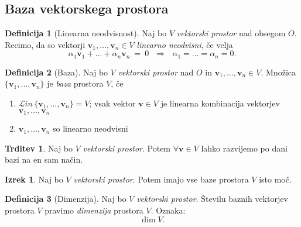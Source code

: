\documentclass[11pt]{article}
\newcommand{\vv}{\mathbf{v}}
\newcommand{\0}{\mathbf{0}}
\newcommand{\Lin}{\mathcal{L}\textit{in}\,}
\theoremstyle{definition}
\newtheorem{definicija}{Definicija}[section]
\theoremstyle{definition}
\newtheorem{trditev}{Trditev}[section]
\theoremstyle{definition}
\newtheorem{izrek}{Izrek}[section]
\theoremstyle{definition}
\begin{document}

\subsection{Baza vektorskega prostora}
\vspace{0.5cm}

\begin{definicija}[Linearna neodvisnost]

Naj bo $V$ \textit{vektorski prostor} nad obsegom $O$. Recimo, da so vektorji $\vv_1,\ldots,\vv_n \in V$ \textit{linearno neodvisni}, če velja
$$\alpha_1\vv_1 + \ldots + \alpha_n\vv_n ~=~ 0 ~~~\Longrightarrow~~~ \alpha_1 = \ldots = \alpha_n = 0.$$

\end{definicija}
\vspace{0.5cm}

\begin{definicija}[Baza]

Naj bo $V$ \textit{vektorski prostor} nad $O$ in $\vv_1,\ldots,\vv_n \in V$. Množica $\{\vv_1,\ldots,\vv_n\}$ je \textit{baza} prostora $V$, če
\begin{enumerate}
	\item $\Lin\{\vv_1,\ldots,\vv_n\} = V$; vsak vektor $\vv \in V$ je linearna kombinacija vektorjev $\vv_1,\ldots,\vv_n$
	\item $\vv_1,\ldots,\vv_n$ so linearno neodvisni
\end{enumerate}

\end{definicija}
\vspace{0.5cm}

\begin{trditev}

Naj bo $V$ \textit{vektorski prostor}. Potem $\forall \vv \in V$ lahko razvijemo po dani bazi na en sam način.

\end{trditev}
\vspace{0.5cm}

\begin{izrek}

Naj bo $V$ \textit{vektorski prostor}. Potem imajo vse baze prostora $V$ isto moč.

\end{izrek}
\vspace{0.5cm}

\begin{definicija}[Dimenzija]

Naj bo $V$ \textit{vektorski prostor}. Številu baznih vektorjev prostora $V$ pravimo \textit{dimenzija} prostora $V$. Oznaka:
$$\dim V.$$

\end{definicija}
\vspace{0.5cm}
\end{document}
